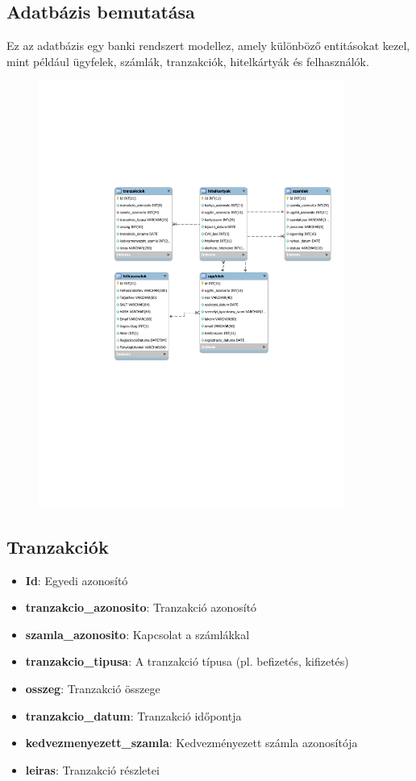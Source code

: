 \documentclass[colorlinks]{thesis-kando}
\theoremstyle{definition}
\theoremstyle{remark}
\begin{document}
\begin{itemize}
\section{Adatbázis bemutatása}
Ez az adatbázis egy banki rendszert modellez, amely különböző entitásokat kezel, mint például ügyfelek, számlák, tranzakciók, hitelkártyák és felhasználók.
\begin{figure}[h]
    \centering
    \includegraphics[width=10cm]{figures/adatb.pdf}
\end{figure}


\subsection{Tranzakciók}
\begin{itemize}
    \item \textbf{Id}: Egyedi azonosító
    \item \textbf{tranzakcio\_azonosito}: Tranzakció azonosító
    \item \textbf{szamla\_azonosito}: Kapcsolat a számlákkal
    \item \textbf{tranzakcio\_tipusa}: A tranzakció típusa (pl. befizetés, kifizetés)
    \item \textbf{osszeg}: Tranzakció összege
    \item \textbf{tranzakcio\_datum}: Tranzakció időpontja
    \item \textbf{kedvezmenyezett\_szamla}: Kedvezményezett számla azonosítója
    \item \textbf{leiras}: Tranzakció részletei
\end{itemize}


\end{itemize}
\end{document}
